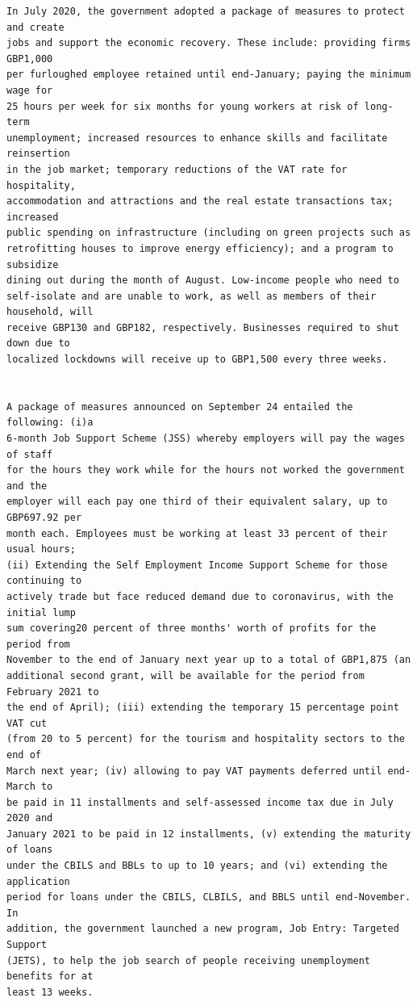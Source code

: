 \documentclass[10pt, letterpaper]{article}
\begin{document}
\begin{spacing}{1.4}
\begin{scriptsize}
\begin{spacing}{.85}
\begin{verbatim}
In July 2020, the government adopted a package of measures to protect and create
jobs and support the economic recovery. These include: providing firms GBP1,000
per furloughed employee retained until end-January; paying the minimum wage for
25 hours per week for six months for young workers at risk of long-term
unemployment; increased resources to enhance skills and facilitate reinsertion
in the job market; temporary reductions of the VAT rate for hospitality,
accommodation and attractions and the real estate transactions tax; increased
public spending on infrastructure (including on green projects such as
retrofitting houses to improve energy efficiency); and a program to subsidize
dining out during the month of August. Low-income people who need to
self-isolate and are unable to work, as well as members of their household, will
receive GBP130 and GBP182, respectively. Businesses required to shut down due to
localized lockdowns will receive up to GBP1,500 every three weeks.


A package of measures announced on September 24 entailed the following: (i)a
6-month Job Support Scheme (JSS) whereby employers will pay the wages of staff
for the hours they work while for the hours not worked the government and the
employer will each pay one third of their equivalent salary, up to GBP697.92 per
month each. Employees must be working at least 33 percent of their usual hours;
(ii) Extending the Self Employment Income Support Scheme for those continuing to
actively trade but face reduced demand due to coronavirus, with the initial lump
sum covering20 percent of three months' worth of profits for the period from
November to the end of January next year up to a total of GBP1,875 (an
additional second grant, will be available for the period from February 2021 to
the end of April); (iii) extending the temporary 15 percentage point VAT cut
(from 20 to 5 percent) for the tourism and hospitality sectors to the end of
March next year; (iv) allowing to pay VAT payments deferred until end-March to
be paid in 11 installments and self-assessed income tax due in July 2020 and
January 2021 to be paid in 12 installments, (v) extending the maturity of loans
under the CBILS and BBLs to up to 10 years; and (vi) extending the application
period for loans under the CBILS, CLBILS, and BBLS until end-November. In
addition, the government launched a new program, Job Entry: Targeted Support
(JETS), to help the job search of people receiving unemployment benefits for at
least 13 weeks.



\end{verbatim}
\end{spacing}
\end{scriptsize}
\end{spacing}
\end{document}
